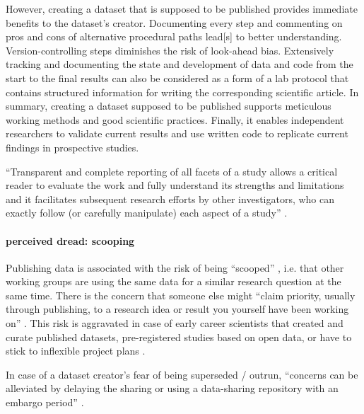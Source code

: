 %
However, creating a dataset that is supposed to be published provides immediate
benefits to the dataset's creator.
%
Documenting every step and commenting on pros and cons of alternative procedural
paths lead[s] to better understanding.
%
Version-controlling steps diminishes the risk of look-ahead bias.
%
Extensively tracking and documenting the state and development of data and code
from the start to the final results can also be considered as a form of a lab
protocol that contains structured information for writing the corresponding
scientific article.
%
In summary, creating a dataset supposed to be published supports meticulous
working methods and good scientific practices.
%
Finally, it enables independent researchers to validate current results and use
written code to replicate current findings in prospective studies.


``Transparent and complete reporting of all facets of a study allows a critical
reader to evaluate the work and fully understand its strengths and limitations
%
and it facilitates subsequent research efforts by other investigators, who can
exactly follow (or carefully manipulate) each aspect of a study''
\citep{nichols2017best}.




\paragraph{perceived dread: scooping}



%
Publishing data is associated with the risk of being ``scooped''
\citep[cf.][]{laine2017afraid}, i.e. that other working groups are using the
same data for a similar research question at the same time.
%
There is the concern that someone else might ``claim priority, usually through
publishing, to a research idea or result you yourself have been working on''
\citep{laine2017afraid}.
%
This risk is aggravated in case of early career scientists that created and
curate published datasets, pre-registered studies based on open data, or have to
stick to inflexible project plans \citep[cf.][]{toribio2021early}.

%
In case of a dataset creator's fear of being superseded / outrun, ``concerns can
be alleviated by delaying the sharing or using a data-sharing repository with an
embargo period'' \citep{nichols2017best}.





\pagebreak


